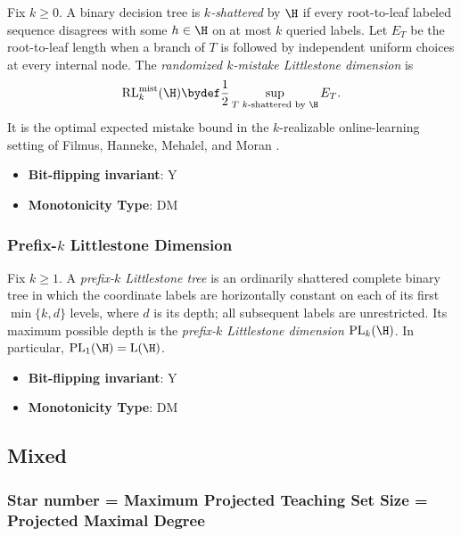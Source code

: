       \begin{definition}\label{def:randomized_kmistake_littlestone_dimension}
      Fix $k\ge0$.  A binary decision tree is \emph{$k$-shattered} by $\H$ if every root-to-leaf labeled sequence disagrees with some $h\in\H$ on at most $k$ queried labels.  Let $E_T$ be the root-to-leaf length when a branch of $T$ is followed by independent uniform choices at every internal node.  The \emph{randomized $k$-mistake Littlestone dimension} is
      \[
        \mathrm{RL}^{\mathrm{mist}}_k(\H)\bydef\frac12\sup_{T\text{ $k$-shattered by }\H}E_T.
      \]
      It is the optimal expected mistake bound in the $k$-realizable online-learning setting of Filmus, Hanneke, Mehalel, and Moran \cite{filmus2023randomized}.
      \end{definition}
      \begin{itemize}
      \item {\bf Bit-flipping invariant}: Y
      \item {\bf Monotonicity Type}: DM
      \end{itemize}
\subsubsection{Prefix-$k$ Littlestone Dimension}
      
      \begin{definition}\label{def:prefix_littlestone_dimension}
      Fix $k\ge1$.  A \emph{prefix-$k$ Littlestone tree} is an ordinarily shattered complete binary tree in which the coordinate labels are horizontally constant on each of its first $\min\{k,d\}$ levels, where $d$ is its depth; all subsequent labels are unrestricted.  Its maximum possible depth is the \emph{prefix-$k$ Littlestone dimension} $\mathrm{PL}_k(\H)$.  In particular, $\mathrm{PL}_1(\H)=\mathrm L(\H)$.
      \end{definition}
      \begin{itemize}
      \item {\bf Bit-flipping invariant}: Y
      \item {\bf Monotonicity Type}: DM
      \end{itemize}
\subsection{Mixed}\label{sec:Mixed}
\subsubsection{Star number = Maximum Projected Teaching Set Size = Projected Maximal Degree}
      
